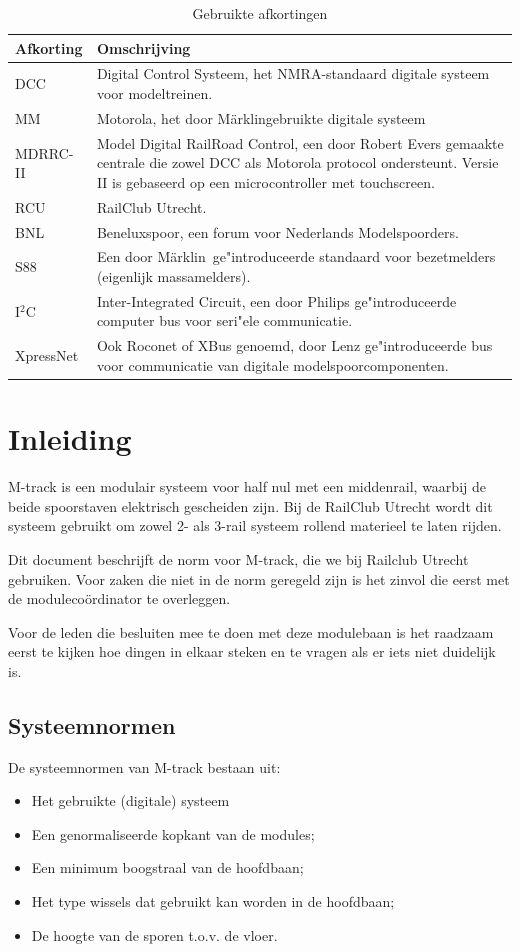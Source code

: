 \documentclass[12pt,a4paper]{report}
\newcommand*{\marklin}{M\"{a}rklin}
\newcommand*{\isqc}{I$^{2}$C}
\begin{document}
\begin{table}[!ht]
\begin{tabular}{| l |p{13cm}|}
\hline
\rowcolor[gray]{0.84}Afkorting & Omschrijving\\
\hline
DCC & Digital Control Systeem, het NMRA-standaard digitale systeem voor modeltreinen.\\
\hline
MM & Motorola, het door \marklin gebruikte digitale systeem\\
\hline
MDRRC-II&Model Digital RailRoad Control, een door Robert Evers gemaakte centrale die zowel DCC als Motorola protocol ondersteunt. Versie II is gebaseerd op een microcontroller met touchscreen.\\
\hline
RCU&RailClub Utrecht.\\
\hline
BNL&Beneluxspoor, een forum voor Nederlands Modelspoorders.\\
\hline
S88&Een door \marklin \ ge"{i}ntroduceerde standaard voor bezetmelders (eigenlijk massamelders).\\
\hline
\isqc &Inter-Integrated Circuit, een door Philips ge"{i}ntroduceerde computer bus voor seri"{e}le communicatie.\\
\hline
XpressNet&Ook Roconet of XBus genoemd, door Lenz ge"{i}ntroduceerde bus voor communicatie van digitale modelspoorcomponenten.\\
\hline
\end{tabular}
\caption{Gebruikte afkortingen}
\end{table}

\chapter{Inleiding}
\label{ch:normen}
M-track is een modulair systeem voor half nul met een middenrail, waarbij de beide spoorstaven elektrisch gescheiden zijn. Bij de RailClub Utrecht wordt dit systeem gebruikt om zowel 2- als 3-rail systeem rollend materieel te laten rijden.

Dit document beschrijft de norm voor M-track, die we bij Railclub Utrecht gebruiken. Voor zaken die niet in de norm geregeld zijn is het zinvol die eerst met de moduleco\"{o}rdinator te overleggen.

Voor de leden die besluiten mee te doen met deze modulebaan is het raadzaam eerst te kijken hoe dingen in elkaar steken en te vragen als er iets niet duidelijk is.

\section{Systeemnormen}
De systeemnormen van M-track bestaan uit:
\begin{itemize}
\item Het gebruikte (digitale) systeem
\item Een genormaliseerde kopkant van de modules;
\item Een minimum boogstraal van de hoofdbaan;
\item Het type wissels dat gebruikt kan worden in de hoofdbaan;
\item De hoogte van de sporen t.o.v. de vloer.
\end{itemize}
\end{document}
